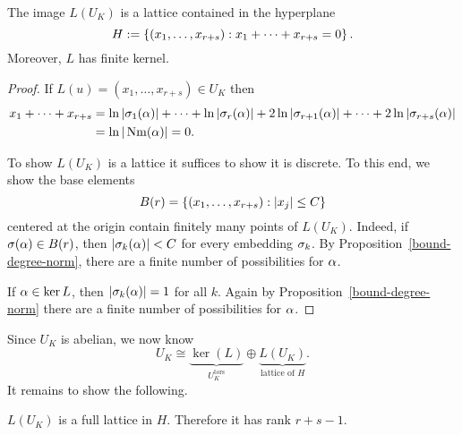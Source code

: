 \begin{pr}
The image $L(U_K)$ is a lattice contained in the hyperplane
\[
H:=\set{(x_1,\ldots, x_{r+s})}{x_1+\cdots%
+x_{r+s}=0}.
\]
Moreover, $L$ has finite kernel.
\end{pr}
\begin{proof}
If $L(u)=(x_1,\ldots, x_{r+s})\in U_K$ then 
\begin{align*}
x_1+\cdots +x_{r+s}&=\ln |\sigma_1(\alpha)|+\cdots +\ln|\sigma_r(\alpha)|+2\ln|\sigma_{r+1}(\alpha)|+\cdots +2\ln|\sigma_{r+s}(\alpha)|\\
&=\ln|\operatorname{Nm}(\alpha)|=0.
\end{align*}

To show $L(U_K)$ is a lattice it suffices to show it is discrete. To this end, we show the base elements 
\[B(r)=\left\{{ (x_1,\ldots, x_{r+s})}:{|x_j|\le C}\right\}\]
centered at the origin contain finitely many points of $L(U_K)$. Indeed, if $\sigma(\alpha)\in B(r)$, then $|\sigma_k(\alpha)|<C$ for every embedding $\sigma_k$. By Proposition~\ref{bound-degree-norm}, there are a finite number of possibilities for $\alpha$.

If $\alpha\in \ker L$, then $|\sigma_k(\alpha)|=1$ for all $k$. Again by Proposition~\ref{bound-degree-norm} there are a finite number of possibilities for $\alpha$.
\end{proof}
Since $U_K$ is abelian, we now know
\[
U_K\cong \underbrace{\ker(L)}_{U_K^{\text{tors}}}\oplus \underbrace{L(U_K)}_{\text{lattice of }H}.
\]
It remains to show the following.
\begin{lem}
$L(U_K)$ is a full lattice in $H$. Therefore it has rank $r+s-1$.
\end{lem}
